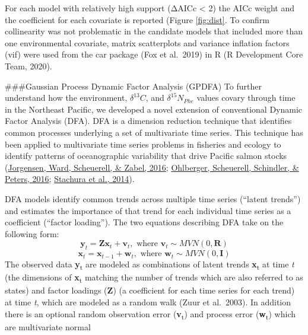 \documentclass [11pt, proquest] {uwthesis}[2015/03/03]
\begin{document}
For each model with relatively high support (ΔAICc \textless{} 2) the AICc weight and the coefficient for each covariate is reported (Figure \ref{fig:dist}. To confirm collinearity was not problematic in the candidate models that included more than one environmental covariate, matrix scatterplots and variance inflation factors (vif) were used from the car package (Fox et al.~2019) in R (R Development Core Team, 2020).

\#\#\#Gaussian Process Dynamic Factor Analysis (GPDFA)
To further understand how the environment, \(\delta^{13}C\), and \(\delta^{15}N_{Phe}\) values covary through time in the Northeast Pacific, we developed a novel extension of conventional Dynamic Factor Analysis (DFA). DFA is a dimension reduction technique that identifies common processes underlying a set of multivariate time series. This technique has been applied to multivariate time series problems in fisheries and ecology to identify patterns of oceanographic variability that drive Pacific salmon stocks (\protect\hyperlink{ref-Jorgensen2016}{Jorgensen, Ward, Scheuerell, \& Zabel, 2016}; \protect\hyperlink{ref-Ohlberger2016}{Ohlberger, Scheuerell, Schindler, \& Peters, 2016}; \protect\hyperlink{ref-Stachura2014}{Stachura et al., 2014}).

DFA models identify common trends across multiple time series (``latent trends'') and estimates the importance of that trend for each individual time series as a coefficient (``factor loading''). The two equations describing DFA take on the following form:
\begin{equation} 
 \boldsymbol{y}_t = \boldsymbol{Zx}_t + \boldsymbol{v}_t,\mbox{ where }\boldsymbol{v}_t \sim MVN(0,\boldsymbol{R})
  \label{eq:gdfa1}
\end{equation}
\begin{equation} 
 \boldsymbol{x}_t = \boldsymbol{x}_{t-1} + \boldsymbol{w}_t,\mbox{ where }\boldsymbol{w}_t \sim MVN(0,\boldsymbol{I})
  \label{eq:gdfa2}
\end{equation}
The observed data \textbf{y}\textsubscript{t} are modeled as combinations of latent trends \textbf{x}\textsubscript{t} at time \emph{t} (the dimensions of \textbf{x}\textsubscript{t} matching the number of trends which are also referred to as states) and factor loadings (\textbf{Z}) (a coefficient for each time series for each trend) at time \emph{t}, which are modeled as a random walk (Zuur et al.~2003). In addition there is an optional random observation error (\textbf{v}\textsubscript{t}) and process error (\textbf{w}\textsubscript{t}) which are multivariate normal
\end{document}
